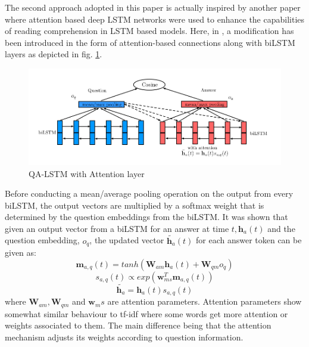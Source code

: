 \documentclass[a4paper,12pt]{report}
\begin{document}
            The second approach adopted in this paper is actually inspired by another paper \citep{bilstmherman} where attention based deep LSTM networks were used to enhance the capabilities of reading comprehension in LSTM based models. Here, in \citep{lstmhaighextractive}, a modification has been introduced in the form of attention-based connections along with biLSTM layers as depicted in fig. \ref{lstmhaigattention}.
            \begin{figure}
                \centering
                \includegraphics[scale=0.35]{../images/lstm-bilstmhaighattention.png}
                \caption{QA-LSTM with Attention layer \citep{lstmhaighextractive}}\label{lstmhaigattention}
            \end{figure}

            Before conducting a mean/average pooling operation on the output from every biLSTM, the output vectors are multiplied by a softmax weight that is determined by the question embeddings from the biLSTM.
            It was shown that given an output vector from a biLSTM for an answer at time $ t, \textbf{h}_{a}(t)$ and the question embedding, $ o_q $, the updated vector $  \tilde{\textbf{h}_{a}}(t)$ for each answer token
            can be given as:
            \begin{equation}\label{bilstmAttentioneq}
                \textbf{m}_{a,q}(t) = tanh(\textbf{W}_{am}\textbf{h}_{a}(t) + \textbf{W}_{qm}o_{q})
            \end{equation}
            \begin{equation}\label{bilstmattentioneq2}
                s_{a,q}(t) \propto exp(\textbf{w}^{T}_{ms}\textbf{m}_{a,q}(t))
            \end{equation}
            \begin{equation}\label{bilstmattentioneq3}
               \tilde{\textbf{h}_{a}} = \textbf{h}_{a}(t)s_{a,q}(t)
            \end{equation}
            where  $ \textbf{W}_{am}, \textbf{W}_{qm} $ and $ \textbf{w}_ms $ are attention parameters. Attention parameters show somewhat similar behaviour to tf-idf  where some words get more attention or weights associated to them. The main difference being that the attention mechanism adjusts its weights according to question information.
\end{document}
